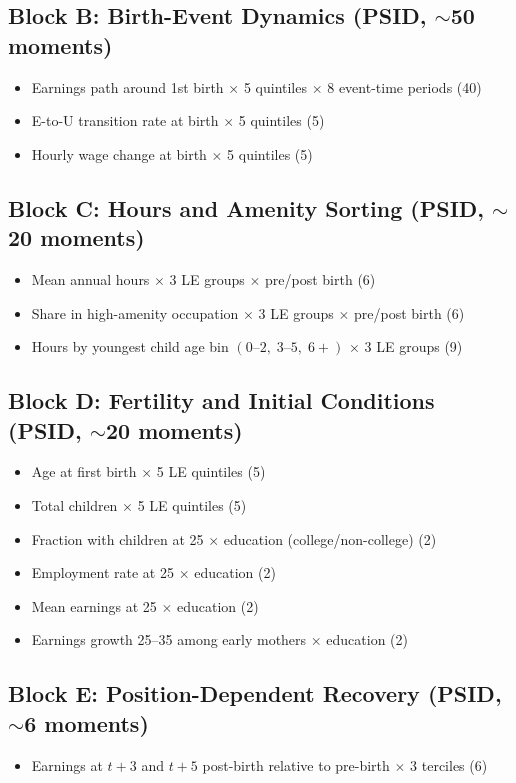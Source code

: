 \documentclass[11pt]{article}
\begin{document}
\subsection{Block B: Birth-Event Dynamics (PSID, $\sim$50 moments)}
\begin{itemize}[nosep]
  \item Earnings path around 1st birth $\times$ 5 quintiles $\times$ 8 event-time periods \hfill (40)
  \item E-to-U transition rate at birth $\times$ 5 quintiles \hfill (5)
  \item Hourly wage change at birth $\times$ 5 quintiles \hfill (5)
\end{itemize}

\subsection{Block C: Hours and Amenity Sorting (PSID, $\sim$20 moments)}
\begin{itemize}[nosep]
  \item Mean annual hours $\times$ 3 LE groups $\times$ pre/post birth \hfill (6)
  \item Share in high-amenity occupation $\times$ 3 LE groups $\times$ pre/post birth \hfill (6)
  \item Hours by youngest child age bin $(0\text{--}2,\; 3\text{--}5,\; 6+)$ $\times$ 3 LE groups \hfill (9)
\end{itemize}

\subsection{Block D: Fertility and Initial Conditions (PSID, $\sim$20 moments)}
\begin{itemize}[nosep]
  \item Age at first birth $\times$ 5 LE quintiles \hfill (5)
  \item Total children $\times$ 5 LE quintiles \hfill (5)
  \item Fraction with children at 25 $\times$ education (college/non-college) \hfill (2)
  \item Employment rate at 25 $\times$ education \hfill (2)
  \item Mean earnings at 25 $\times$ education \hfill (2)
  \item Earnings growth 25--35 among early mothers $\times$ education \hfill (2)
\end{itemize}

\subsection{Block E: Position-Dependent Recovery (PSID, $\sim$6 moments)}
\begin{itemize}[nosep]
  \item Earnings at $t{+}3$ and $t{+}5$ post-birth relative to pre-birth $\times$ 3 terciles \hfill (6)
\end{itemize}
\end{document}
